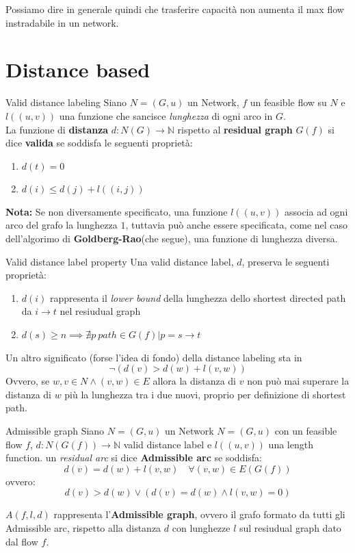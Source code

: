 \documentclass[a4paper, 11pt]{report}
\begin{document}
Possiamo dire in generale quindi che trasferire capacità non aumenta il max flow instradabile in un network.

\newpage
\section{Distance based}
\begin{definition}[label = VDL]{Valid distance labeling}{}
    Siano $N = (G,u)$ un Network, $f$ un feasible flow su $N$ e $l((u,v))$ una funzione che sancisce \textit{lunghezza} di ogni arco in $G$.\\
    La funzione di \textbf{distanza} $d: N(G) \rightarrow \mathbb{N}$ rispetto al \textbf{residual graph}
    $G(f)$  si dice \textbf{valida} se soddisfa le seguenti proprietà:
    \begin{enumerate}
        \item $d(t) = 0$
        \item $d(i) \le d(j) + l((i,j))$
    \end{enumerate}
\end{definition}
\textbf{Nota:} Se non diversamente specificato, una funzione $l((u,v))$ associa ad ogni arco del grafo la lunghezza $1$,
 tuttavia può anche essere specificata, come nel caso dell'algorimo di \textbf{Goldberg-Rao}(che segue),
una funzione di lunghezza diversa. 
\begin{obs}{Valid distance label property}{}
    Una valid distance label, $d$, preserva le seguenti proprietà:
    \begin{enumerate}
        \item $d(i)$ rappresenta il \textit{lower bound} della lunghezza dello shortest directed path da $i \rightarrow t$
        nel resiudual graph
        \item $d(s) \ge n \implies \nexists p\ path \in G(f) | p = s \rightarrow t $ %
    \end{enumerate}
    
\end{obs}
Un altro significato (forse l'idea di fondo) della distance labeling sta in \[\neg (d(v) > d(w) + l(v,w))\]
Ovvero, se $w,v \in N \land (v,w) \in E$ allora la distanza di $v$ non può mai superare la distanza di $w$ più la lunghezza tra i due nuovi, 
proprio per definizione di shortest path.

\begin{definition}[label = AdmissibleGraph]{Admissible graph}{}
    Siano $N = (G,u)$ un Network $N = (G,u)$ con un feasible flow $f$, $d: N(G(f)) \rightarrow \mathbb{N}$ valid distance label 
    e $l((u,v))$ una length function.
    un \textit{residual arc} si dice \textbf{Admissible arc} se soddisfa:
    \[d(v) = d(w) + l(v,w) \quad \forall (v,w) \in E(G(f))\]
    ovvero:
    \[d(v) > d(w) \lor (d(v) = d(w) \land l(v,w) = 0)\]
    
    $A(f,l,d)$ rappresenta l'\textbf{Admissible graph}, ovvero il grafo formato da tutti gli Admissible arc, rispetto alla distanza $d$ con lunghezze $l$ 
    sul resiudual graph dato dal flow $f$.
\end{definition}
\end{document}
